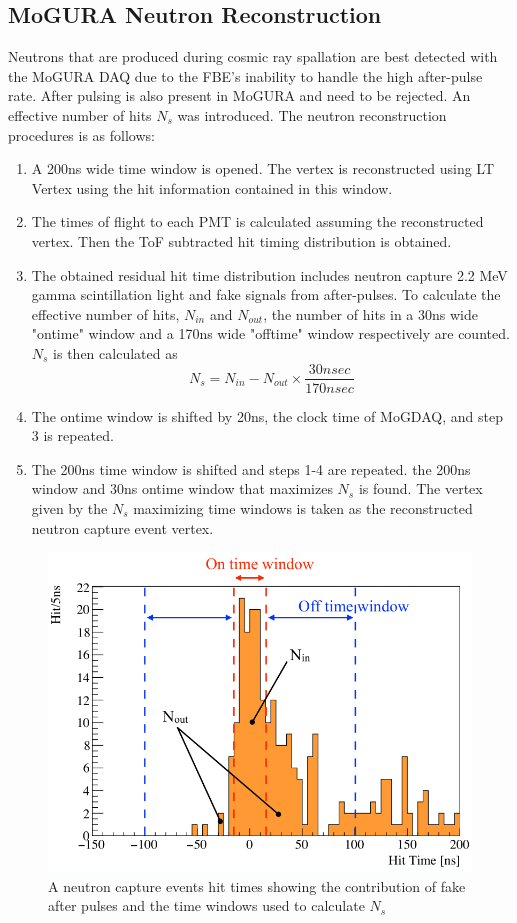 \subsection{MoGURA Neutron Reconstruction}
Neutrons that are produced during cosmic ray spallation are best detected with the MoGURA DAQ due to the FBE's inability to handle the high after-pulse rate. After pulsing is also present in MoGURA and need to be rejected. An effective number of hits $N_s$ was introduced. The neutron reconstruction procedures is as follows:
\begin{enumerate}
	\item A 200ns wide time window is opened. The vertex is reconstructed using LT Vertex using the hit information contained in this window.
	\item The times of flight to each PMT is calculated assuming the reconstructed vertex. Then the ToF subtracted hit timing distribution is obtained.
	\item The obtained residual hit time distribution includes neutron capture 2.2 MeV gamma scintillation light and fake signals from after-pulses. To calculate the effective number of hits, $N_{in}$ and $N_{out}$, the number of hits in a 30ns wide "ontime" window and a 170ns wide "offtime" window respectively are counted. $N_s$ is then calculated as
	\begin{equation}
		N_s=N_{in}-N_{out}\times\frac{30 nsec}{170 nsec}
	\end{equation}
	\item The ontime window is shifted by 20ns, the clock time of MoGDAQ, and step 3 is repeated.
	\item The 200ns time window is shifted and steps 1-4 are repeated. the 200ns window and 30ns ontime window that maximizes $N_s$ is found. The vertex given by the $N_s$ maximizing time windows is taken as the reconstructed neutron capture event vertex.
\end{enumerate}
\begin{figure}[htb]
	\centering
	\includegraphics[scale=0.4]{neutron_reco.png}
	\caption{A neutron capture events hit times showing the contribution of fake after pulses and the time windows used to calculate $N_s$}
	\label{fig:neutron_reco}
\end{figure}
